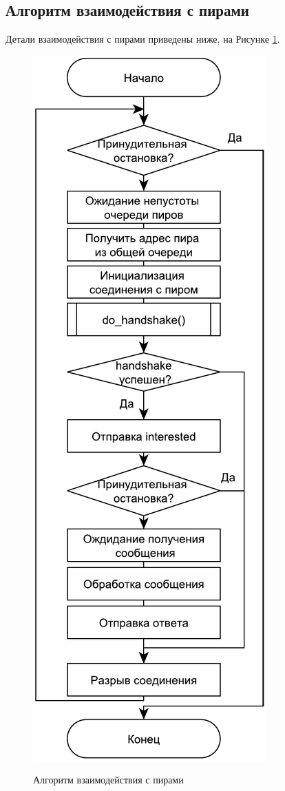 \subsection{Алгоритм взаимодействия с пирами}
Детали взаимодействия с пирами приведены ниже, на Рисунке \ref{fig203:image}.
\begin{figure}[h]
	\begin{center}
		{\includegraphics[scale = 0.7]{img/peer.pdf}}
		\caption{Алгоритм взаимодействия с пирами}
		\label{fig203:image}
	\end{center}
\end{figure}